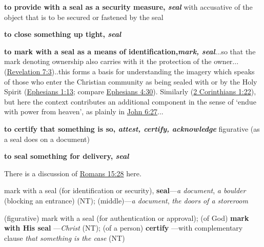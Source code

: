 				\begin{compactdesc}
					\item[BDAG 871a] \textbf{}
						\begin{compactitem}
							\item[1] \textbf{to provide with a seal as a security measure, \textit{seal}} with accusative of the object that is to be secured or fastened by the seal
							\item[2] \textbf{to close something up tight, \textit{seal}}
							\item[3] \textbf{to mark with a seal as a means of identification,\textit{mark, seal}}...so that the mark denoting ownership also carries with it the protection of the owner... (\hyperref[REVELATIONNT-7-3]{Revelation 7:3})..this forms a basis for understanding the imagery which speaks of those who enter the Christian community as being sealed with or by the Holy Spirit (\hyperref[EPHESIANS-1-13]{Ephesians 1:13}; compare \hyperref[EPHESIANS-4-30]{Ephesians 4:30}). Similarly  (\hyperref[2CORINTHIANS-1-22]{2 Corinthians 1:22}), but here the context contributes an additional component in the sense of `endue with power from heaven', as plainly in \hyperref[JOHN-6-27]{John 6:27}...
							\item[4] \textbf{to certify that something is so, \textit{attest, certify, acknowledge}} figurative (as a seal does on a document)
							\item[5] \textbf{to seal something for delivery, \textit{seal}}
								\begin{compactitem}
									\item There is a discussion of \hyperref[ROMANS-15-28]{Romans 15:28} here.
								\end{compactitem}
						\end{compactitem}
					\item[CGL 1349b, PDF 1389] \textbf{}
						\begin{compactitem}
							\item[1] mark with a seal (for identification or security), \textbf{seal}---\textit{a document}, \textit{a boulder} (blocking an entrance) (NT); (middle)---\textit{a document}, \textit{the doors of a storeroom}
							\item[2] (figurative) mark with a seal (for authentication or approval); (of God) \textbf{mark with His seal} ---\textit{Christ} (NT); (of a person) \textbf{certify} ---with complementary clause \textit{that something is the case} (NT)

\end{compactitem}
\end{compactdesc}
